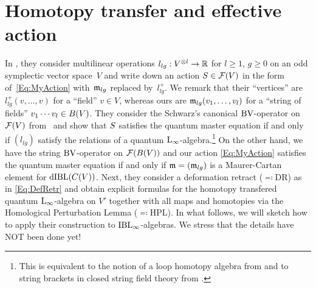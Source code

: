 \documentclass[\MainFolder/Text.tex]{subfiles}
\begin{document}
\section{Homotopy transfer and effective action}\label{Sec:HPL}

In \cite{Doubek2018}, they consider multilinear operations $l_{lg}: V^{\otimes l} \rightarrow \mathbb{R}$ for $l\ge 1$, $g\ge 0$ on an odd symplectic vector space~$V$ and write down an action $S\in \mathcal{F}(V)$ in the form of~\eqref{Eq:MyAction} with~$\mathfrak{m}_{lg}$ replaced by~$l_{lg}^+$. We remark that their ``vertices'' are $l^+_{lg}(v,\dotsc,v)$ for a ``field'' $v\in V$, whereas ours are $\mathfrak{m}_{lg}(v_1,\dotsc,v_l)$ for a ``string of fields'' $v_1\dotsb v_l\in B(V)$. They consider the Schwarz's canonical $\mathrm{BV}$-operator on $\mathcal{F}(V)$ from~\cite{Schwarz1992} and show that $S$ satisfies the quantum master equation if and only if $(l_{lg})$ satisfy the relations of a quantum $\mathrm{L}_\infty$-algebra.\footnote{This is equivalent to the notion of a loop homotopy algebra from \cite{Markl1997} and to string brackets in closed string field theory from \cite{Zwiebach1992}.} On the other hand, we have the string $\mathrm{BV}$-operator on $\mathcal{F}(B(V))$ and our action \eqref{Eq:MyAction} satisfies the quantum master equation if and only if $\mathfrak{m}=(\mathfrak{m}_{lg})$ is a Maurer-Cartan element for $\mathrm{dIBL}(C(V))$. Next, they consider a deformation retract ($\eqqcolon\mathrm{DR}$) as in \eqref{Eq:DefRetr} and obtain explicit formulas for the homotopy transfered quantum $\mathrm{L}_\infty$-algebra on $V'$ together with all maps and homotopies via the Homological Perturbation Lemma ($\eqqcolon\mathrm{HPL}$). In what follows, we will sketch how to apply their construction to $\mathrm{IBL}_\infty$-algebras. We stress that the details have NOT been done yet!
\end{document}
